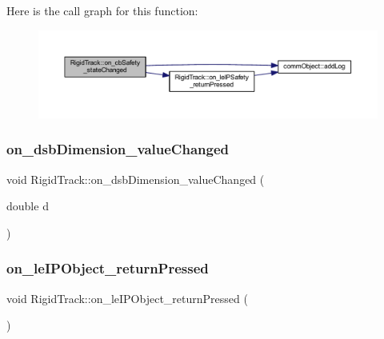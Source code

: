 Here is the call graph for this function\+:\nopagebreak
\begin{figure}[H]
\begin{center}
\leavevmode
\includegraphics[width=350pt]{class_rigid_track_a8f999fa968f4cc9fa548bdc8438b32c4_cgraph}
\end{center}
\end{figure}
\mbox{\label{class_rigid_track_ae5e44de9f4e3cacdd647c0305936b02b}} 
\subsubsection{\texorpdfstring{on\+\_\+dsb\+Dimension\+\_\+value\+Changed}{on\_dsbDimension\_valueChanged}}
{\footnotesize\ttfamily void Rigid\+Track\+::on\+\_\+dsb\+Dimension\+\_\+value\+Changed (\begin{DoxyParamCaption}\item[{double}]{d }\end{DoxyParamCaption})\hspace{0.3cm}{\ttfamily [slot]}}

\mbox{\label{class_rigid_track_a9f037a061b2577815fc80e5e9f8d46d9}} 
\subsubsection{\texorpdfstring{on\+\_\+le\+I\+P\+Object\+\_\+return\+Pressed}{on\_leIPObject\_returnPressed}}
{\footnotesize\ttfamily void Rigid\+Track\+::on\+\_\+le\+I\+P\+Object\+\_\+return\+Pressed (\begin{DoxyParamCaption}{ }\end{DoxyParamCaption})\hspace{0.3cm}{\ttfamily [slot]}}

